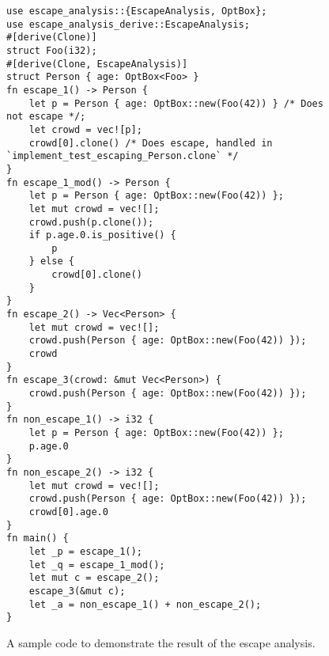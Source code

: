 \documentclass[en]{snu-ece-bsc-thesis}
\theoremstyle{definition}
\begin{document}
\begin{figure}[htbp]
\begin{verbatim}
use escape_analysis::{EscapeAnalysis, OptBox};
use escape_analysis_derive::EscapeAnalysis;
#[derive(Clone)]
struct Foo(i32);
#[derive(Clone, EscapeAnalysis)]
struct Person { age: OptBox<Foo> }
fn escape_1() -> Person {
    let p = Person { age: OptBox::new(Foo(42)) } /* Does not escape */;
    let crowd = vec![p];
    crowd[0].clone() /* Does escape, handled in `implement_test_escaping_Person.clone` */
}
fn escape_1_mod() -> Person {
    let p = Person { age: OptBox::new(Foo(42)) };
    let mut crowd = vec![];
    crowd.push(p.clone());
    if p.age.0.is_positive() {
        p
    } else {
        crowd[0].clone()
    }
}
fn escape_2() -> Vec<Person> {
    let mut crowd = vec![];
    crowd.push(Person { age: OptBox::new(Foo(42)) });
    crowd
}
fn escape_3(crowd: &mut Vec<Person>) {
    crowd.push(Person { age: OptBox::new(Foo(42)) });
}
fn non_escape_1() -> i32 {
    let p = Person { age: OptBox::new(Foo(42)) };
    p.age.0
}
fn non_escape_2() -> i32 {
    let mut crowd = vec![];
    crowd.push(Person { age: OptBox::new(Foo(42)) });
    crowd[0].age.0
}
fn main() {
    let _p = escape_1();
    let _q = escape_1_mod();
    let mut c = escape_2();
    escape_3(&mut c);
    let _a = non_escape_1() + non_escape_2();
}
\end{verbatim}
\caption{A sample code to demonstrate the result of the escape analysis.}\label{fig:sample-analysis}
\end{figure}
\end{document}
